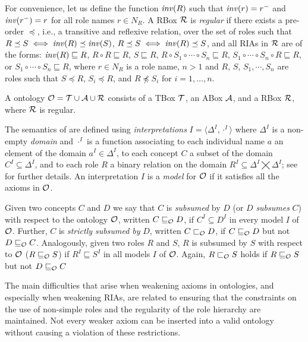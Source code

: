 \documentclass[
]{ceurart}
\begin{document}
For convenience, let us define the function $\mathit{inv}(R)$ such that $\mathit{inv}(r) = r^-$ and $\mathit{inv}(r^-) = r$ for all role names $r \in N_R$. A RBox $\mathcal{R}$ is \emph{regular} if there exists a pre-order $\preceq$, i.e., a transitive and reflexive relation, over the set of roles such that $R \preceq S \iff \mathit{inv}(R) \preceq \mathit{inv}(S)$, $R \preceq S \iff \mathit{inv}(R) \preceq S$, and all RIAs in $\mathcal{R}$ are of the forms:
$\mathit{inv}(R) \sqsubseteq R$,
$R \circ R \sqsubseteq R$,
$S \sqsubseteq R$, $R \circ S_1 \circ \cdots \circ S_n \sqsubseteq R$,
$S_1 \circ \cdots \circ S_n \circ R \sqsubseteq R$, or
$S_1 \circ \cdots \circ S_n \sqsubseteq R$,
where $r \in N_R$ is a role name, $n > 1$ and $R$, $S$, $S_1, \cdots, S_n$ are roles such that $S \preceq R$, $S_i \preceq R$, and $R \not\preceq S_i$ for $i = 1, \dots, n$.

A \SROIQ ontology $\mathcal{O} = \mathcal{T} \cup \mathcal{A} \cup \mathcal{R}$ consists of a TBox $\mathcal{T}$, an ABox $\mathcal{A}$, and a RBox $\mathcal{R}$, where $\mathcal{R}$ is regular.

The semantics of \SROIQ are defined using \emph{interpretations} $I = \langle \Delta^I, \cdot^I \rangle$ where $\Delta^I$ is a non-empty \emph{domain} and $\cdot^I$ is a function associating to each individual name $a$ an element of the domain $a^I \in \Delta^I$, to each concept $C$ a subset of the domain $C^I \subseteq \Delta^I$, and to each role $R$ a binary relation on the domain $R^I \subseteq \Delta^I \bigtimes \Delta^I$; see \cite{baader_horrocks_lutz_sattler_2017,HorrocksKutzSattlerKR2006} for further details. An interpretation $I$ is a \emph{model} for $\mathcal{O}$ if it satisfies all the axioms in $\mathcal{O}$.

Given two concepts $C$ and $D$ we say that $C$ is \emph{subsumed} by $D$ (or $D$ \emph{subsumes} $C$) with respect to the ontology $\mathcal{O}$, written $C \sqsubseteq_\mathcal{O} D$, if $C^I \subseteq D^I$ in every model $I$ of $\mathcal{O}$. Further, $C$ is \emph{strictly subsumed by} $D$, written $C \sqsubset_\mathcal{O} D$, if $C \sqsubseteq_\mathcal{O} D$ but not $D \sqsubseteq_\mathcal{O} C$. Analogously, given two roles $R$ and $S$, $R$ is subsumed by $S$ with respect to $\mathcal{O}$ ($R \sqsubseteq_\mathcal{O} S$) if $R^I \sqsubseteq S^I$ in all models $I$ of $\mathcal{O}$. Again, $R \sqsubset_\mathcal{O} S$ holds if $R \sqsubseteq_\mathcal{O} S$ but not $D \sqsubseteq_\mathcal{O} C$

The main difficulties that arise when weakening axioms in \SROIQ ontologies, and especially when weakening RIAs, are related to ensuring that the constraints on the use of non-simple roles and the regularity of the role hierarchy are maintained. Not every weaker axiom can be inserted into a valid \SROIQ ontology without causing a violation of these restrictions.
\end{document}
